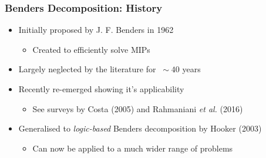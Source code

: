 \documentclass{beamer}
\begin{document}
\begin{frame}
\frametitle{Benders Decomposition: History}
\begin{itemize}
	\item Initially proposed by J. F. Benders in 1962\vspace{1mm}
	\begin{itemize}
		\item Created to efficiently solve MIPs\vspace{3mm}\pause
	\end{itemize}
	\item Largely neglected by the literature for $\:\sim40$ years\vspace{3mm}\pause
	\item Recently re-emerged showing it's applicability\vspace{1mm}
	\begin{itemize}
		\item See surveys by Costa (2005) and Rahmaniani \emph{et al.} (2016)\vspace{3mm}\pause
	\end{itemize}
	\item Generalised to \emph{logic-based} Benders decomposition by Hooker (2003)\vspace{1mm}
	\begin{itemize}
		\item Can now be applied to a much wider range of problems
	\end{itemize}
\end{itemize}
\end{frame}
\end{document}
